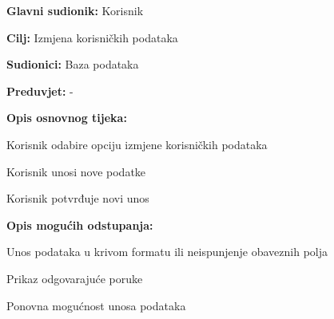 					\noindent {}
					\begin{packed_item}
						
						\item \textbf{Glavni sudionik: }Korisnik
						\item  \textbf{Cilj:} Izmjena korisničkih podataka 
						\item  \textbf{Sudionici:} Baza podataka
						\item  \textbf{Preduvjet:} -
						\item  \textbf{Opis osnovnog tijeka:}
						\item[] \begin{packed_enum}
							
							\item Korisnik odabire opciju izmjene korisničkih podataka
							\item Korisnik unosi nove podatke
							\item Korisnik potvrđuje novi unos
							
						\end{packed_enum}
						\item  \textbf{Opis mogućih odstupanja:}
						
					
						\item[] \begin{packed_item}
							
							\item[2.a] Unos podataka u krivom formatu ili neispunjenje obaveznih polja
							\item[] \begin{packed_enum}
								
								\item Prikaz odgovarajuće poruke
								\item Ponovna mogućnost unosa podataka
								
							\end{packed_enum}
							
						\end{packed_item}
						
					\end{packed_item}
				
